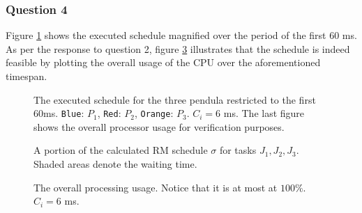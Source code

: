 \subsubsection{Question 4}

Figure \ref{fig:01.4.1.small} shows the executed schedule magnified over the
period of the first 60 ms.
As per the response to question 2, figure \ref{fig:01.4.2} illustrates that the
schedule is indeed feasible by plotting the overall usage of the CPU over the
aforementioned timespan.

\begin{sidewaysfigure}
  \begin{figure}[H]\centering
    \scalebox{1}{}
    \caption{The executed schedule for the three pendula restricted to the first
      60ms. \texttt{Blue}: $P_1$, \texttt{Red}: $P_2$,
      \texttt{Orange}: $P_3$. $C_i = 6$ ms. The last figure shows the overall
      processor usage for verification purposes.}
    \label{fig:01.4.1.small}
  \end{figure}

  \begin{figure}[H]\centering
    \scalebox{0.7}{}
    \caption{A portion of the calculated RM schedule $\sigma$ for tasks
      $J_1, J_2, J_3$.  Shaded areas denote the waiting time.}
    \label{fig:rm_6}
  \end{figure}
\end{sidewaysfigure}


\begin{figure}[H]\centering
  \scalebox{0.7}{}
  \caption{The overall processing usage. Notice that it is at most at $100\%$.
    $C_i = 6$ ms.}
  \label{fig:01.4.2}
\end{figure}
